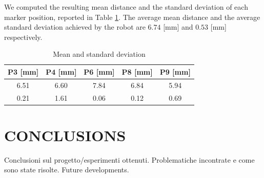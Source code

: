 \documentclass[a4paper, 10pt, conference]{ieeeconf}      %
\begin{document}
We computed the resulting mean distance and the standard deviation of each marker position, reported in Table \ref{tab:mean}. The average mean distance and the average standard deviation achieved by the robot are $6.74$ [mm] and $0.53$ [mm] respectively.

\begin{table}[h]
\begin{center}
\caption{Mean and standard deviation}
\label{tab:mean}
\begin{tabular}{|c||c||c||c||c|}
\hline
\textbf{P3 [mm]} & \textbf{P4 [mm]} & \textbf{P6 [mm]} & \textbf{P8 [mm]} & \textbf{P9 [mm]} \\
\hline
6.51 & 6.60 & 7.84 & 6.84 & 5.94\\
0.21 & 1.61 & 0.06 & 0.12 & 0.69\\
\hline
\end{tabular}
\end{center}
\end{table}

\section{CONCLUSIONS}

Conclusioni sul progetto/esperimenti ottenuti.
Problematiche incontrate e come sono state risolte.
Future developments.

\addtolength{\textheight}{-12cm}   %



\end{document}
